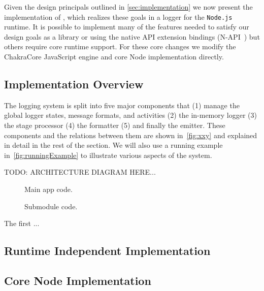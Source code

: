 Given the design principals outlined in \autoref{sec:implementation} we now 
present the implementation of \projn, which realizes these goals in a logger 
for the \texttt{Node.js}~\cite{Node} runtime. It is possible to implement many 
of the features needed to satisfy our design goals as a library or using the 
native API extension bindings (N-API~\cite{NAPI}) but others require core 
runtime support. For these core changes we modify the ChakraCore JavaScript 
engine and core Node implementation directly.

\subsection{Implementation Overview}
The logging system is split into five major components that (1) manage the 
global logger states, message formats, and activities (2) the in-memory logger 
(3) the stage processor (4) the formatter (5) and finally the emitter. These 
components and the relations between them are shown in~\autoref{fig:xxy} and 
explained in detail in the rest of the section. We will also use a running 
example in~\autoref{fig:runningExample} to illustrate various aspects of the 
system.

TODO: ARCHITECTURE DIAGRAM HERE...

\begin{figure*}[t]
\begin{minipage}[b]{0.5\textwidth}
     
    \caption{Main app code.}
    \label{fig:appmain}
\end{minipage}
\begin{minipage}[b]{0.5\textwidth}
    
    \caption{Submodule code.}
    \label{fig:appsub}
\end{minipage}
\end{figure*}

The first ...

\subsection{Runtime Independent Implementation}

\subsection{Core Node Implementation}
